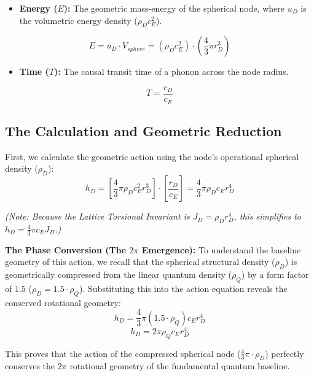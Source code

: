 \begin{itemize}
    \item \textbf{Energy ($E$):} The geometric mass-energy of the spherical node, where $u_D$ is the volumetric energy density ($\rho_D c_E^2$).
\end{itemize}
\begin{equation}
    E = u_D \cdot V_{sphere} = (\rho_D c_E^2) \cdot \left(\frac{4}{3}\pi r_D^3\right)
\end{equation}

\begin{itemize}
    \item \textbf{Time ($T$):} The causal transit time of a phonon across the node radius.
\end{itemize}
\begin{equation}
    T = \frac{r_D}{c_E}
\end{equation}

\subsection{The Calculation and Geometric Reduction}
First, we calculate the geometric action using the node's operational spherical density ($\rho_D$):
\begin{equation}
    h_D = \left[\frac{4}{3}\pi \rho_D c_E^2 r_D^3\right] \cdot \left[\frac{r_D}{c_E}\right] = \frac{4}{3}\pi \rho_D c_E r_D^4
\end{equation}

\textit{(Note: Because the Lattice Torsional Invariant is $J_D = \rho_D r_D^4$, this simplifies to $h_D = \frac{4}{3}\pi c_E J_D$.)}

\textbf{The Phase Conversion (The $2\pi$ Emergence):} To understand the baseline geometry of this action, we recall that the spherical structural density ($\rho_D$) is geometrically compressed from the linear quantum density ($\rho_Q$) by a form factor of $1.5$ ($\rho_D = 1.5 \cdot \rho_Q$). Substituting this into the action equation reveals the conserved rotational geometry:
\begin{equation}
    h_D = \frac{4}{3}\pi (1.5 \cdot \rho_Q) c_E r_D^4
\end{equation}
\begin{equation}
    h_D = 2\pi \rho_Q c_E r_D^4
\end{equation}

This proves that the action of the compressed spherical node ($\frac{4}{3}\pi \cdot \rho_D$) perfectly conserves the $2\pi$ rotational geometry of the fundamental quantum baseline.

